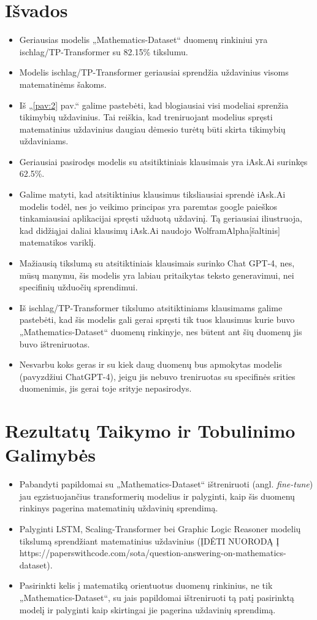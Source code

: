 \documentclass[conference]{IEEEtran}
\begin{document}
\section{Išvados}
\begin{itemize}
    \item Geriausias modelis „Mathematics-Dataset“ duomenų rinkiniui yra ischlag/TP-Transformer su 82.15\% tikslumu.
    \item Modelis ischlag/TP-Transformer geriausiai sprendžia uždavinius visoms matematinėms šakoms.
    \item Iš „\ref{pav:2} pav.“ galime pastebėti, kad blogiausiai visi modeliai sprenžia tikimybių uždavinius. Tai reiškia, kad treniruojant modelius spręsti matematinius uždavinius daugiau dėmesio turėtų būti skirta tikimybių uždaviniams.
    \item Geriausiai pasirodęs modelis su atsitiktiniais klausimais yra iAsk.Ai surinkęs 62.5\%.
    \item Galime matyti, kad atsitiktinius klausimus tiksliausiai sprendė iAsk.Ai modelis todėl, nes jo veikimo principas yra paremtas google paieškos tinkamiausiai aplikacijai spręsti užduotą uždavinį. Tą geriausiai iliustruoja, kad didžiąjai daliai klausimų iAsk.Ai naudojo WolframAlpha[šaltinis] matematikos variklį.
    \item Mažiausią tikslumą su atsitiktiniais klausimais surinko Chat GPT-4, nes, mūsų manymu, šis modelis yra labiau pritaikytas teksto generavimui, nei specifinių užduočių sprendimui.
    \item Iš ischlag/TP-Transformer tikslumo atsitiktiniams klausimams galime pastebėti, kad šis modelis gali gerai spręsti tik tuos klausimus kurie buvo „Mathematics-Dataset“ duomenų rinkinyje, nes būtent ant šių duomenų jis buvo ištreniruotas.
    \item Nesvarbu koks geras ir su kiek daug duomenų bus apmokytas modelis (pavyzdžiui ChatGPT-4), jeigu jis nebuvo treniruotas su specifinės srities duomenimis, jis gerai toje srityje nepasirodys.
\end{itemize}
\section{Rezultatų Taikymo ir Tobulinimo Galimybės}
\begin{itemize}
    \item Pabandyti papildomai su „Mathematics-Dataset“ ištreniruoti (angl. \textit{fine-tune}) jau egzistuojančius transformerių modelius ir palyginti, kaip šis duomenų rinkinys pagerina matematinių uždavinių sprendimą.
    \item Palyginti LSTM, Scaling-Transformer bei Graphic Logic Reasoner modelių tikslumą sprendžiant matematinius uždavinius (ĮDĖTI NUORODĄ Į https://paperswithcode.com/sota/question-answering-on-mathematics-dataset).
    \item Pasirinkti kelis į matematiką orientuotus duomenų rinkinius, ne tik „Mathematics-Dataset“, su jais papildomai ištreniruoti tą patį pasirinktą modelį ir palyginti kaip skirtingai jie pagerina uždavinių sprendimą. 
\end{itemize}



\end{document}
